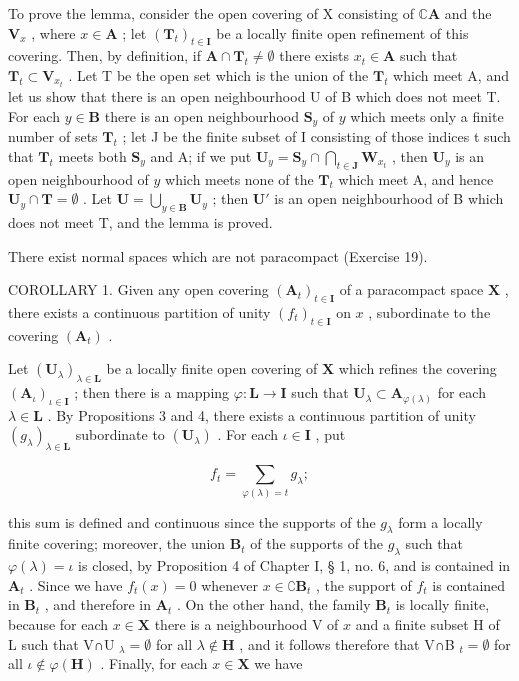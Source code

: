 To prove the lemma, consider the open covering of X consisting of \(\mathbb{C}\mathbf{A}\) and the \(\mathbf{V}_x\) , where \(x \in \mathbf{A}\) ; let \((\mathbf{T}_t)_{t \in \mathbf{I}}\) be a locally finite open refinement of this covering. Then, by definition, if \(\mathbf{A} \cap \mathbf{T}_t \neq \emptyset\) there exists \(x_t \in \mathbf{A}\) such that \(\mathbf{T}_t \subset \mathbf{V}_{x_t}\) . Let T be the open set which is the union of the \(\mathbf{T}_t\) which meet A, and let us show that there is an open neighbourhood U of B which does not meet T. For each \(y \in \mathbf{B}\) there is an open neighbourhood \(\mathbf{S}_y\) of \(y\) which meets only a finite number of sets \(\mathbf{T}_t\) ; let J be the finite subset of I consisting of those indices t such that \(\mathbf{T}_t\) meets both \(\mathbf{S}_y\) and A; if we put \(\mathbf{U}_y = \mathbf{S}_y \cap \bigcap_{t \in \mathbf{J}} \mathbf{W}_{x_t}\) , then \(\mathbf{U}_y\) is an open neighbourhood of \(y\) which meets none of the \(\mathbf{T}_t\) which meet A, and hence \(\mathbf{U}_y \cap \mathbf{T} = \emptyset\) . Let \(\mathbf{U} = \bigcup_{y \in \mathbf{B}} \mathbf{U}_y\) ; then \(\mathbf{U}'\) is an open neighbourhood of B which does not meet T, and the lemma is proved.

There exist normal spaces which are not paracompact (Exercise 19).

COROLLARY 1. Given any open covering \((\mathbf{A}_t)_{t \in \mathbf{I}}\) of a paracompact space \(\mathbf{X}\) , there exists a continuous partition of unity \((f_t)_{t \in \mathbf{I}}\) on \(x\) , subordinate to the covering \((\mathbf{A}_t)\) .

Let \((\mathbf{U}_{\lambda})_{\lambda \in \mathbf{L}}\) be a locally finite open covering of \(\mathbf{X}\) which refines the covering \((\mathbf{A}_{\iota})_{\iota \in \mathbf{I}}\) ; then there is a mapping \(\varphi : \mathbf{L} \to \mathbf{I}\) such that \(\mathbf{U}_{\lambda} \subset \mathbf{A}_{\varphi(\lambda)}\) for each \(\lambda \in \mathbf{L}\) . By Propositions 3 and 4, there exists a continuous partition of unity \((g_{\lambda})_{\lambda \in \mathbf{L}}\) subordinate to \((\mathbf{U}_{\lambda})\) . For each \(\iota \in \mathbf{I}\) , put

\[
f _ {t} = \sum_ {\varphi (\lambda) = t} g _ {\lambda};
\]

this sum is defined and continuous since the supports of the \(g_{\lambda}\) form a locally finite covering; moreover, the union \(\mathbf{B}_{t}\) of the supports of the \(g_{\lambda}\) such that \(\varphi(\lambda)=\iota\) is closed, by Proposition 4 of Chapter I, § 1, no. 6, and is contained in \(\mathbf{A}_{t}\) . Since we have \(f_{t}(x)=0\) whenever \(x\in\complement\mathbf{B}_{t}\) , the support of \(f_{t}\) is contained in \(\mathbf{B}_{t}\) , and therefore in \(\mathbf{A}_{t}\) . On the other hand, the family \(\mathbf{B}_{t}\) is locally finite, because for each \(x\in\mathbf{X}\) there is a neighbourhood V of \(x\) and a finite subset H of L such that V∩U \(_{\lambda}=\emptyset\) for all \(\lambda\notin\mathbf{H}\) , and it follows therefore that V∩B \(_{t}=\emptyset\) for all \(\iota\notin\varphi(\mathbf{H})\) . Finally, for each \(x\in\mathbf{X}\) we have

